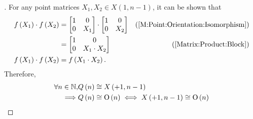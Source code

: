 \documentclass[stu, babel, american, biblatex, a4paper, leqno, draftall]{apa7}
\begin{document}
\begin{proof}[]
    For any point matrices $X_1, X_2 \in X\left(1,n-1\right)$, it can be shown that
    \begin{align*}
        f\left(X_1\right)\cdot f\left(X_2\right)
                                                 & =\begin{bmatrix}
            1 & 0   \\
            0 & X_1 \\
        \end{bmatrix}\cdot\begin{bmatrix}
            1 & 0   \\
            0 & X_2 \\
        \end{bmatrix}                         & \text{(\cref{M:Point:Orientation:Isomorphism})}\\
                                                 & =\begin{bmatrix}
            1 & 0            \\
            0 & X_1\cdot X_2 \\
        \end{bmatrix}                                                        & \text{(\cref{Matrix:Product:Block})}                                        \\
        f\left(X_1\right)\cdot f\left(X_2\right) & = f\left(X_1\cdot X_2\right)\text{.}
    \end{align*}
    Therefore,
    \begin{align*}
    	\forall n\in\mathbb{N}, 
    	&
    	Q\left(n\right)\cong X\left(+1, n-1\right) \\
    	\implies &
    	Q\left(n\right)\cong \operatorname{O}\left(n\right) \iff X\left(+1, n-1\right)\cong \operatorname{O}\left(n\right)
    \end{align*}


\end{proof}
\end{document}
